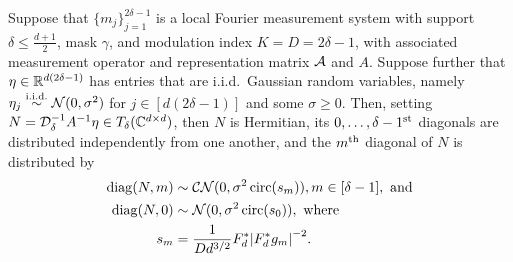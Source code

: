 \begin{proposition}
  Suppose that $\{m_j\}_{j = 1}^{2 \delta - 1}$ is a local Fourier measurement system with support $\delta \le \frac{d + 1}{2}$, mask $\gamma$, and modulation index $K = D = 2 \delta - 1$, with associated measurement operator and representation matrix $\mathcal{A}$ and $A$.  Suppose further that $\eta \in \mathbb{R}^{d (2 \delta - 1)}$ has entries that are i.i.d.~Gaussian random variables, namely $\eta_j \overset{\text{i.i.d.}}{\sim} \mathcal{N}(0, \sigma^2)$ for $j \in [d (2 \delta - 1)]$ and some $\sigma \ge 0$.  Then, setting $N = \mathcal{D}_\delta^{-1} A^{-1} \eta \in T_\delta(\mathbb{C}^{d \times d})$, then $N$ is Hermitian, its $0, \ldots, \delta - 1^{\text{st}}$ diagonals are distributed  independently from one another, and the $m^{\text{th}}$ diagonal of $N$ is distributed by \begin{align} \diag(N, m) &\sim \CN(0, \sigma^2 \circop(s_m)), m \in [\delta - 1], \ \text{and} \nonumber \\ \diag(N, 0) &\sim \Nc(0, \sigma^2 \circop(s_0)), \ \text{where} \nonumber \\ s_m &= \frac{1}{D d^{3 / 2}} F_d^* \abs*{F_d^* g_m}^{-2}.\label{eq:s_m} \end{align}%
  \label{prop:var_dist}
\end{proposition}

